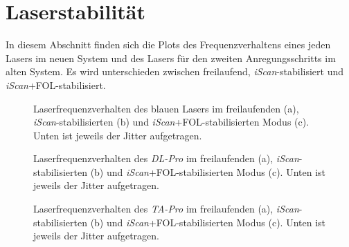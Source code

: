 \section{Laserstabilität}\label{anh:sec:laserstabilitaet}
In diesem Abschnitt finden sich die Plots des Frequenzverhaltens eines jeden
Lasers im neuen System und des Lasers für den zweiten Anregungsschritts im alten
System. Es wird unterschieden zwischen freilaufend, \textit{iScan}-stabilisiert
und \textit{iScan}+FOL-stabilisiert.
\begin{figure}[hp]
 	\centering
 	\footnotesize
 	\fbox{\parbox{\dimexpr \linewidth - 2\fboxrule - 2\fboxsep}{
 	\subfloat[]{
		\label{subfig:laserstabilitaet_a_freilaufend}
		
		}\\
 	\subfloat[]{
		\label{subfig:laserstabilitaet_a_iScan}
		
		}\\
	 \subfloat[]{
		\label{subfig:laserstabilitaet_a_iScan+FOL}
		
		}
	}}
	\caption[Laserfrequenzverhalten, blauer Laser]{Laserfrequenzverhalten des
	blauen Lasers im freilaufenden (a), \textit{iScan}-stabilisierten (b) und
	\textit{iScan}+FOL-stabilisierten Modus (c). Unten ist jeweils der Jitter
	aufgetragen.}
	\label{fig:laserstabilitaet_a}
\end{figure}
\begin{figure}[hp]
 	\centering
 	\footnotesize
 	\fbox{\parbox{\dimexpr \linewidth - 2\fboxrule - 2\fboxsep}{
 	\subfloat[]{
		\label{subfig:laserstabilitaet_b_freilaufend}
		
		}\\
 	\subfloat[]{
		\label{subfig:laserstabilitaet_b_iScan}
		
		}\\
	 \subfloat[]{
		\label{subfig:laserstabilitaet_b_iScan+FOL}
		
		}
	}}
	\caption[Laserfrequenzverhalten, \textit{DL-Pro}]{Laserfrequenzverhalten des
	\textit{DL-Pro} im freilaufenden (a), \textit{iScan}-stabilisierten (b) und
	\textit{iScan}+FOL-stabilisierten Modus (c). Unten ist jeweils der Jitter
	aufgetragen.}
	\label{fig:laserstabilitaet_b}
\end{figure}
\begin{figure}[hp]
 	\centering
 	\footnotesize
 	\fbox{\parbox{\dimexpr \linewidth - 2\fboxrule - 2\fboxsep}{
 	\subfloat[]{
		\label{subfig:laserstabilitaet_c_freilaufend}
		
		}\\
 	\subfloat[]{
		\label{subfig:laserstabilitaet_c_iScan}
		
		}\\
	 \subfloat[]{
		\label{subfig:laserstabilitaet_c_iScan+FOL}
		
		}
	}}
	\caption[Laserfrequenzverhalten, \textit{TA-Pro}]{Laserfrequenzverhalten des
	\textit{TA-Pro} im freilaufenden (a), \textit{iScan}-stabilisierten (b) und
	\textit{iScan}+FOL-stabilisierten Modus (c). Unten ist jeweils der Jitter
	aufgetragen.}
	\label{fig:laserstabilitaet_c}
\end{figure}
